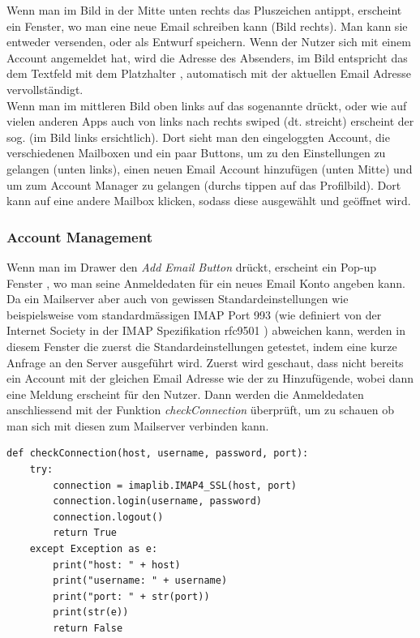 \documentclass[a4paper,11pt]{article}
\begin{document}
Wenn man im Bild in der Mitte unten rechts das Pluszeichen antippt, erscheint ein Fenster, wo man eine neue Email schreiben kann (Bild rechts). Man kann sie entweder versenden, oder als Entwurf speichern. Wenn der Nutzer sich mit einem Account angemeldet hat, wird die Adresse des Absenders, im Bild entspricht das dem Textfeld mit dem Platzhalter , automatisch mit der aktuellen Email Adresse vervollständigt.\\

Wenn man im mittleren Bild oben links auf das sogenannte  drückt, oder wie auf vielen anderen Apps auch von links nach rechts swiped (dt. streicht) erscheint der sog.  (im Bild links ersichtlich). Dort sieht man den eingeloggten Account, die verschiedenen Mailboxen und ein paar Buttons, um zu den Einstellungen zu gelangen (unten links), einen neuen Email Account hinzufügen (unten Mitte) und um zum Account Manager zu gelangen (durchs tippen auf das Profilbild). Dort kann auf eine andere Mailbox klicken, sodass diese ausgewählt und geöffnet wird.

\subsubsection{Account Management}

Wenn man im Drawer den \textit{Add Email Button} drückt, erscheint ein Pop-up Fenster , wo man seine Anmeldedaten für ein neues Email Konto angeben kann. Da ein Mailserver aber auch von gewissen Standardeinstellungen wie beispielsweise vom standardmässigen IMAP Port 993 (wie definiert von der Internet Society in der IMAP Spezifikation rfc9501 \cite{rfc9501}) abweichen kann, werden in diesem Fenster die zuerst die Standardeinstellungen getestet, indem eine kurze Anfrage an den Server ausgeführt wird. Zuerst wird geschaut, dass nicht bereits ein Account mit der gleichen Email Adresse wie der zu Hinzufügende, wobei dann eine Meldung erscheint für den Nutzer. Dann werden die Anmeldedaten anschliessend mit der Funktion \textit{checkConnection} überprüft, um zu schauen ob man sich mit diesen zum Mailserver verbinden kann.\\

\lstset{language=python}
\begin{lstlisting}
def checkConnection(host, username, password, port):
    try:
        connection = imaplib.IMAP4_SSL(host, port)
        connection.login(username, password)
        connection.logout()
        return True
    except Exception as e:
        print("host: " + host)
        print("username: " + username)
        print("port: " + str(port))
        print(str(e))
        return False

\end{lstlisting}
\end{document}
